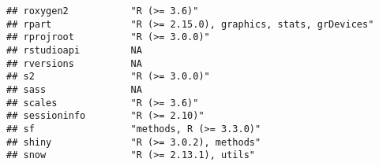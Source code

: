 \documentclass[
]{article}
\begin{document}
\begin{verbatim}
## roxygen2           "R (>= 3.6)"                                                                                                                                                                                          
## rpart              "R (>= 2.15.0), graphics, stats, grDevices"                                                                                                                                                           
## rprojroot          "R (>= 3.0.0)"                                                                                                                                                                                        
## rstudioapi         NA                                                                                                                                                                                                    
## rversions          NA                                                                                                                                                                                                    
## s2                 "R (>= 3.0.0)"                                                                                                                                                                                        
## sass               NA                                                                                                                                                                                                    
## scales             "R (>= 3.6)"                                                                                                                                                                                          
## sessioninfo        "R (>= 2.10)"                                                                                                                                                                                         
## sf                 "methods, R (>= 3.3.0)"                                                                                                                                                                               
## shiny              "R (>= 3.0.2), methods"                                                                                                                                                                               
## snow               "R (>= 2.13.1), utils"                                                                                                                                                                                

\end{verbatim}
\end{document}
